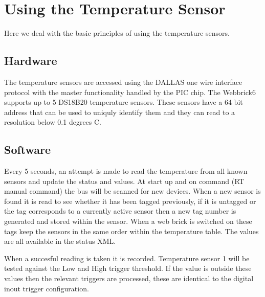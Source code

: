\section {Using the Temperature Sensor}

Here we deal with the basic principles of using the temperature sensors.

\subsection {Hardware}

The temperature sensors are accessed using the DALLAS one wire interface protocol with the master
functionality handled by the PIC chip. The Webbrick6 supports up to 5 DS18B20 temperature sensors. 
These sensors have a 64 bit address that 
can be used to uniquly identify them and they can read to a resolution below 0.1 degrees C.

\subsection {Software}

Every 5 seconds, an attempt is made to read the temperature from all known sensors and update 
the status and values. At start up and on command (RT manual command) the bus will be scanned for new devices. 
When a new sensor is found it is read to see whether it has been tagged previously, if it 
is untagged or the tag corresponds to a currently active sensor then a new tag number is 
generated and stored within the sensor. When a web brick is switched on these tags 
keep the sensors in the same order within the temperature table. The values are all 
available in the status XML.

When a succesful reading is taken it is recorded. Temperature sensor 1 will be tested 
against the Low and High trigger threshold. If the value is outside these values then 
the relevant triggers are processed, these are identical to the digital inout trigger configuration.
 




